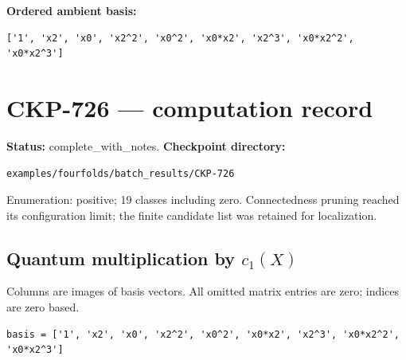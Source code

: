 \documentclass[10pt,a4paper]{article}
\begin{document}
\textbf{Ordered ambient basis:}
\begin{lstlisting}
['1', 'x2', 'x0', 'x2^2', 'x0^2', 'x0*x2', 'x2^3', 'x0*x2^2', 'x0*x2^3']
\end{lstlisting}

\clearpage\section*{CKP-726 --- computation record}
\textbf{Status:} complete\_with\_notes.
\textbf{Checkpoint directory:}
\begin{lstlisting}
examples/fourfolds/batch_results/CKP-726
\end{lstlisting}

Enumeration: positive; 19 classes including zero.
Connectedness pruning reached its configuration limit; the finite candidate list was retained for localization.
\subsection*{Quantum multiplication by $c_1(X)$}
Columns are images of basis vectors. All omitted matrix entries are zero; indices are zero based.

\begin{lstlisting}
basis = ['1', 'x2', 'x0', 'x2^2', 'x0^2', 'x0*x2', 'x2^3', 'x0*x2^2', 'x0*x2^3']
\end{lstlisting}
\end{document}
